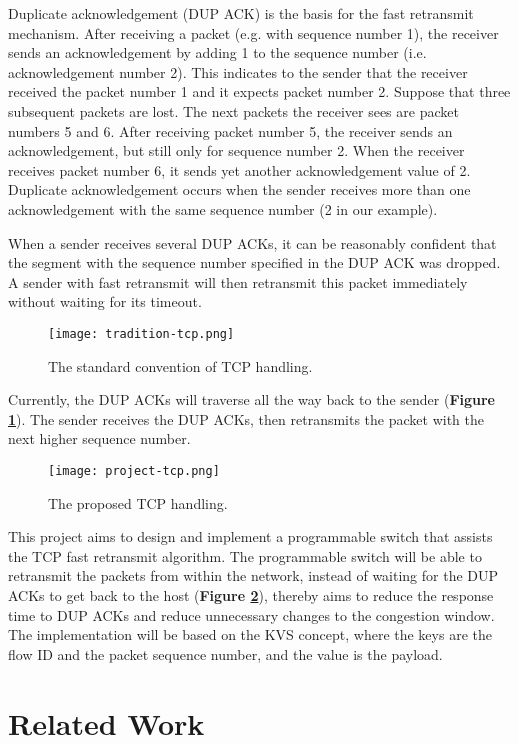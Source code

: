 Duplicate acknowledgement (DUP ACK) is the basis for the fast retransmit mechanism. After receiving a packet (e.g. with sequence number 1), the receiver sends an acknowledgement by adding 1 to the sequence number (i.e. acknowledgement number 2). This indicates to the sender that the receiver received the packet number 1 and it expects packet number 2. Suppose that three subsequent packets are lost. The next packets the receiver sees are packet numbers 5 and 6. After receiving packet number 5, the receiver sends an acknowledgement, but still only for sequence number 2. When the receiver receives packet number 6, it sends yet another acknowledgement value of 2. Duplicate acknowledgement occurs when the sender receives more than one acknowledgement with the same sequence number (2 in our example).

When a sender receives several DUP ACKs, it can be reasonably confident that the segment with the sequence number specified in the DUP ACK was dropped. A sender with fast retransmit will then retransmit this packet immediately without waiting for its timeout.

\begin{figure}[h]
	\centering
	\texttt{[image: tradition-tcp.png]}
	\caption{The standard convention of TCP handling.}
	\label{tradition-tcp}
\end{figure}

Currently, the DUP ACKs will traverse all the way back to the sender (\textbf{Figure \ref{tradition-tcp}}). The sender receives the DUP ACKs, then retransmits the packet with the next higher sequence number. 

\begin{figure}[h]
	\centering
	\texttt{[image: project-tcp.png]}
	\caption{The proposed TCP handling.}
	\label{project-tcp}
\end{figure}

This project aims to design and implement a programmable switch that assists the TCP fast retransmit algorithm. The programmable switch will be able to retransmit the packets from within the network, instead of waiting for the DUP ACKs to get back to the host (\textbf{Figure \ref{project-tcp}}), thereby aims to reduce the response time to DUP ACKs and reduce unnecessary changes to the congestion window. The implementation will be based on the KVS concept, where the keys are the flow ID and the packet sequence number, and the value is the payload.

\section{Related Work}
